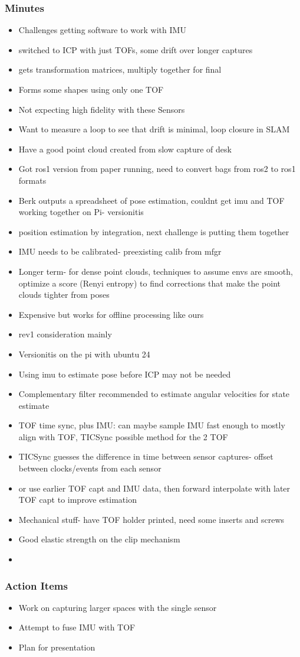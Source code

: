 		\subsubsection*{Minutes}
			\begin{itemize}
				\item Challenges getting software to work with IMU
				\item switched to ICP with just TOFs, some drift over longer captures
				\item gets transformation matrices, multiply together for final
				\item Forms some shapes using only one TOF
				\item Not expecting high fidelity with these Sensors
				\item Want to measure a loop to see that drift is minimal, loop closure in SLAM
				\item Have a good point cloud created from slow capture of desk
				\item Got ros1 version from paper running, need to convert bags from ros2 to ros1 formats
				\item Berk outputs a spreadsheet of pose estimation, couldnt get imu and TOF working together on Pi- versionitis
				\item position estimation by integration, next challenge is putting them together
				\item IMU needs to be calibrated- preexisting calib from mfgr
				\item Longer term- for dense point clouds, techniques to assume envs are smooth, optimize a score (Renyi entropy) to find corrections that make the point clouds tighter from poses 
				\item Expensive but works for offline processing like ours
				\item rev1 consideration mainly
				\item Versionitis on the pi with ubuntu 24
				\item Using imu to estimate pose before ICP may not be needed
				\item Complementary filter recommended to estimate angular velocities for state estimate
				\item TOF time sync, plus IMU: can maybe sample IMU fast enough to mostly align with TOF, TICSync possible method for the 2 TOF
				\item TICSync guesses the difference in time between sensor captures- offset between clocks/events from each sensor
				\item or use earlier TOF capt and IMU data, then forward interpolate with later TOF capt to improve estimation
				\item Mechanical stuff- have TOF holder printed, need some inserts and screws
				\item Good elastic strength on the clip mechanism
				\item 
			\end{itemize}

		\subsubsection*{Action Items}
			\begin{itemize}
				\item Work on capturing larger spaces with the single sensor
				\item Attempt to fuse IMU with TOF
				\item Plan for presentation
			\end{itemize}


